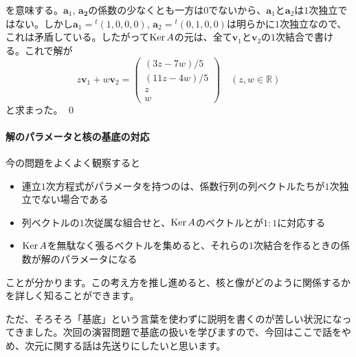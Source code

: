 を意味する。$\bm{a}_1$, $\bm{a_2}$の係数の少なくとも一方は$0$でないから、$\bm{a}_1$と$\bm{a}_2$は$1$次独立ではない。しかし$\bm{a}_1 = {}^t(1, 0, 0, 0)$, $\bm{a}_2 = {}^t(0, 1, 0, 0)$は明らかに$1$次独立なので、これは矛盾している。したがって$\operatorname{Ker} A$の元は、全て$\bm{v}_1$と$\bm{v}_2$の$1$次結合で書ける。これで解が
\[
z\bm{v}_1 + w\bm{v}_2
=
\begin{pmatrix}
(3z - 7w)/5 \\
(11z - 4w)/5 \\
z \\
w
\end{pmatrix}
\quad (z, w\in\mathbb{R})
\]
と求まった。 \qed

\paragraph{解のパラメータと核の基底の対応}

今の問題をよくよく観察すると
\begin{itemize}
\item 連立$1$次方程式がパラメータを持つのは、係数行列の列ベクトルたちが$1$次独立でない場合である
\item 列ベクトルの$1$次従属な組合せと、$\operatorname{Ker} A$のベクトルとが$1:1$に対応する
\item $\operatorname{Ker} A$を無駄なく張るベクトルを集めると、それらの$1$次結合を作るときの係数が解のパラメータになる
\end{itemize}
ことが分かります。この考え方を推し進めると、核と像がどのように関係するかを詳しく知ることができます。

ただ、そろそろ「基底」という言葉を使わずに説明を書くのが苦しい状況になってきました。次回の演習問題で基底の扱いを学びますので、今回はここで話をやめ、次元に関する話は先送りにしたいと思います。


